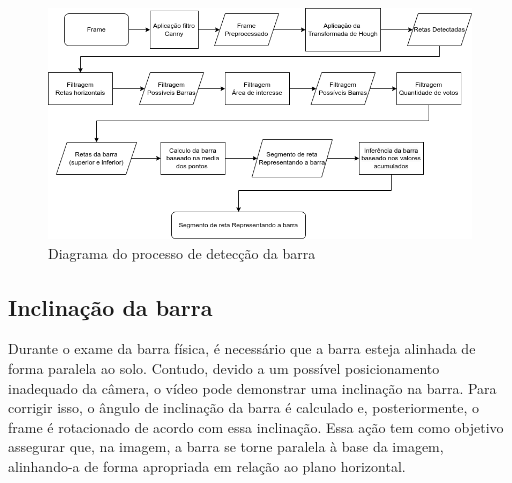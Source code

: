 \begin{figure}[!htb]
	\centering
	\includegraphics[scale=0.6]{figuras/diagrama/detectar barra.png}
	\caption{Diagrama do processo de detecção da barra}
	\label{diagrama:Detectar barra}
\end{figure}
\newpage


\subsection[Inclinação da barra]{Inclinação da barra}\label{sec:Inclinacao da barra}

Durante o exame da barra física, é necessário que a barra esteja alinhada de forma paralela ao solo. Contudo, devido a um possível posicionamento inadequado da câmera, o vídeo pode demonstrar uma inclinação na barra. Para corrigir isso, o ângulo de inclinação da barra é calculado e, posteriormente, o frame é rotacionado de acordo com essa inclinação. Essa ação tem como objetivo assegurar que, na imagem, a barra se torne paralela à base da imagem, alinhando-a de forma apropriada em relação ao plano horizontal.


